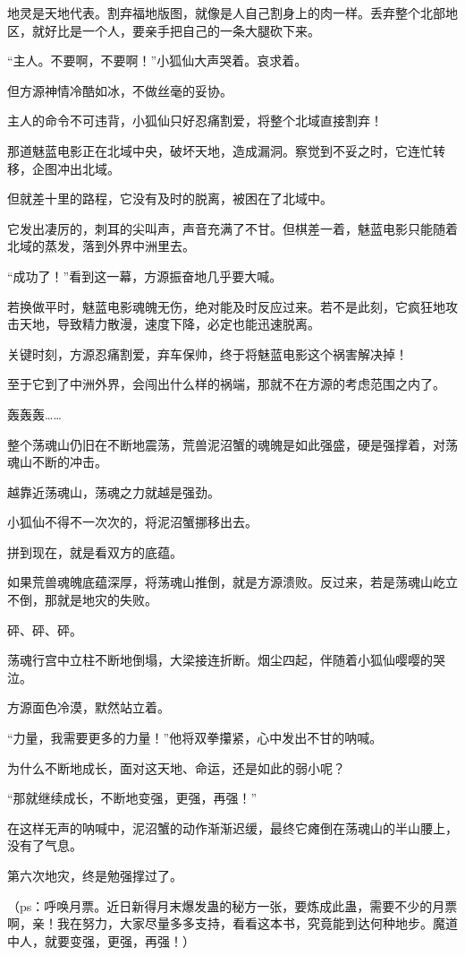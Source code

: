 \begin{this_body}
地灵是天地代表。割弃福地版图，就像是人自己割身上的肉一样。丢弃整个北部地区，就好比是一个人，要亲手把自己的一条大腿砍下来。

“主人。不要啊，不要啊！”小狐仙大声哭着。哀求着。

但方源神情冷酷如冰，不做丝毫的妥协。

主人的命令不可违背，小狐仙只好忍痛割爱，将整个北域直接割弃！

那道魅蓝电影正在北域中央，破坏天地，造成漏洞。察觉到不妥之时，它连忙转移，企图冲出北域。

但就差十里的路程，它没有及时的脱离，被困在了北域中。

它发出凄厉的，刺耳的尖叫声，声音充满了不甘。但棋差一着，魅蓝电影只能随着北域的蒸发，落到外界中洲里去。

“成功了！”看到这一幕，方源振奋地几乎要大喊。

若换做平时，魅蓝电影魂魄无伤，绝对能及时反应过来。若不是此刻，它疯狂地攻击天地，导致精力散漫，速度下降，必定也能迅速脱离。

关键时刻，方源忍痛割爱，弃车保帅，终于将魅蓝电影这个祸害解决掉！

至于它到了中洲外界，会闯出什么样的祸端，那就不在方源的考虑范围之内了。

轰轰轰……

整个荡魂山仍旧在不断地震荡，荒兽泥沼蟹的魂魄是如此强盛，硬是强撑着，对荡魂山不断的冲击。

越靠近荡魂山，荡魂之力就越是强劲。

小狐仙不得不一次次的，将泥沼蟹挪移出去。

拼到现在，就是看双方的底蕴。

如果荒兽魂魄底蕴深厚，将荡魂山推倒，就是方源溃败。反过来，若是荡魂山屹立不倒，那就是地灾的失败。

砰、砰、砰。

荡魂行宫中立柱不断地倒塌，大梁接连折断。烟尘四起，伴随着小狐仙嘤嘤的哭泣。

方源面色冷漠，默然站立着。

“力量，我需要更多的力量！”他将双拳攥紧，心中发出不甘的呐喊。

为什么不断地成长，面对这天地、命运，还是如此的弱小呢？

“那就继续成长，不断地变强，更强，再强！”

在这样无声的呐喊中，泥沼蟹的动作渐渐迟缓，最终它瘫倒在荡魂山的半山腰上，没有了气息。

第六次地灾，终是勉强撑过了。

（ps：呼唤月票。近日新得月末爆发蛊的秘方一张，要炼成此蛊，需要不少的月票啊，亲！我在努力，大家尽量多多支持，看看这本书，究竟能到达何种地步。魔道中人，就要变强，更强，再强！）

\end{this_body}

